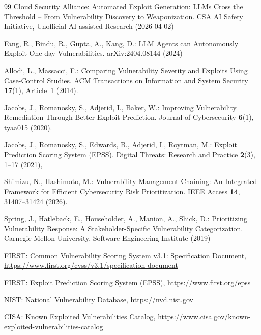 \documentclass[runningheads]{llncs}
\begin{document}
%
%
\begin{thebibliography}{99}
Cloud Security Alliance: Automated Exploit Generation: LLMs Cross the Threshold -- From
Vulnerability Discovery to Weaponization. CSA AI Safety Initiative, Unofficial AI-assisted
Research (2026-04-02)

Fang, R., Bindu, R., Gupta, A., Kang, D.: LLM Agents can Autonomously Exploit One-day
Vulnerabilities. arXiv:2404.08144 (2024)

Allodi, L., Massacci, F.: Comparing Vulnerability Severity and Exploits Using Case-Control
Studies. ACM Transactions on Information and System Security \textbf{17}(1), Article~1 (2014).

Jacobs, J., Romanosky, S., Adjerid, I., Baker, W.: Improving Vulnerability Remediation
Through Better Exploit Prediction. Journal of Cybersecurity \textbf{6}(1), tyaa015 (2020).

Jacobs, J., Romanosky, S., Edwards, B., Adjerid, I., Roytman, M.: Exploit Prediction Scoring System (EPSS). Digital Threats: Research and Practice \textbf{2}(3), 1--17 (2021), 

Shimizu, N., Hashimoto, M.: Vulnerability Management Chaining: An Integrated Framework for
Efficient Cybersecurity Risk Prioritization. IEEE Access \textbf{14}, 31407--31424 (2026).

Spring, J., Hatleback, E., Householder, A., Manion, A., Shick, D.: Prioritizing
Vulnerability Response: A Stakeholder-Specific Vulnerability Categorization. Carnegie Mellon
University, Software Engineering Institute (2019)

FIRST: Common Vulnerability Scoring System v3.1: Specification Document,
\url{https://www.first.org/cvss/v3.1/specification-document}

FIRST: Exploit Prediction Scoring System (EPSS), \url{https://www.first.org/epss}

NIST: National Vulnerability Database, \url{https://nvd.nist.gov}

CISA: Known Exploited Vulnerabilities Catalog,
\url{https://www.cisa.gov/known-exploited-vulnerabilities-catalog}


\end{thebibliography}
\end{document}
